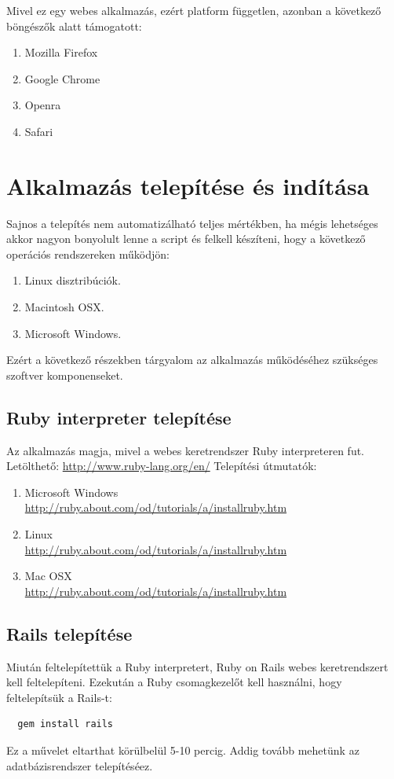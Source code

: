Mivel ez egy webes alkalmazás, ezért platform független, azonban a következő böngészők alatt támogatott:
\begin{enumerate}
  \item Mozilla Firefox
  \item Google Chrome
  \item Openra
  \item Safari
\end{enumerate}


\section{Alkalmazás telepítése és indítása} %
\label{sec:alkalmazás_telepítése_és_indítása}
Sajnos a telepítés nem automatizálható teljes mértékben, ha mégis lehetséges akkor nagyon bonyolult lenne a script és felkell készíteni, hogy a következő operációs rendszereken működjön:
\begin{enumerate}
  \item Linux disztribúciók.
  \item Macintosh OSX.
  \item Microsoft Windows.
\end{enumerate}
Ezért a következő részekben tárgyalom az alkalmazás működéséhez szükséges szoftver komponenseket.
\subsection{Ruby interpreter telepítése} %
\label{sub:ruby_interpreter_telepítése}
Az alkalmazás magja, mivel a webes keretrendszer Ruby interpreteren fut.
Letölthető: \url{http://www.ruby-lang.org/en/}
Telepítési útmutatók:
\begin{enumerate}
  \item Microsoft Windows \\ \url{http://ruby.about.com/od/tutorials/a/installruby.htm}
  \item Linux \\ \url{http://ruby.about.com/od/tutorials/a/installruby.htm}
  \item Mac OSX \\ \url{http://ruby.about.com/od/tutorials/a/installruby.htm}
\end{enumerate}

\subsection{Rails telepítése} %
\label{sub:rails_telepítése}
Miután feltelepítettük a Ruby interpretert, Ruby on Rails webes keretrendszert kell feltelepíteni.
Ezekután a Ruby csomagkezelőt kell használni, hogy feltelepítsük a Rails-t:
\begin{verbatim}
  gem install rails
\end{verbatim}
Ez a művelet eltarthat körülbelül 5-10 percig. Addig tovább mehetünk az adatbázisrendszer telepítéséez.

